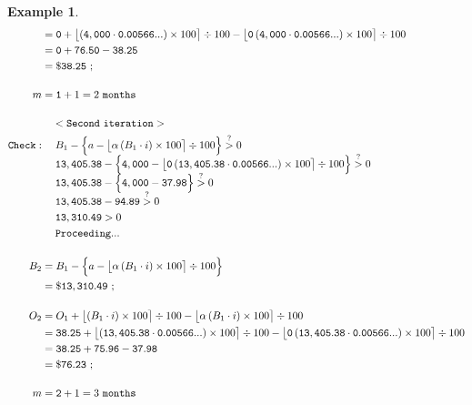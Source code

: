 \documentclass[12pt,letterpaper,oneside]{article}
\newtheorem{example}{Example}[section]
\theoremstyle{remark} %
\begin{document}
\begin{example}
\begin{align*}
	&=\mathtt{\interest}+\big\lfloor{\left(\mathtt{\balance}\cdot \mathtt{\rate}\right)\times 100}\big\rceil\div 100-\big\lfloor{\mathtt{\proportion}\left(\mathtt{\balance}\cdot \mathtt{\rate}\right)\times 100}\big\rceil\div 100\\
	&=\mathtt{\interest}+\mathtt{76.50}-\mathtt{38.25}\\
	&=\mathtt{\$38.25}\ ;\\[12pt]
	m&=\mathtt{\monthsp}+1=2\mathtt{\ months}\\[12pt]
	&\quad\;\mathtt{<Second\ iteration>}\\
	\mathtt{Check:}&\quad\;B_{\monthsitb}-\Big\{a-\big\lfloor{\alpha\left(B_{\monthsitb}\cdot i\right)\times 100}\big\rceil\div 100\Big\}\overset{?}{>}0\\[-6pt]
	&\quad\;\mathtt{\balanceitb}-\Big\{\mathtt{\amount}-\big\lfloor{\mathtt{\proportion}\left(\mathtt{\balanceitb}\cdot \mathtt{\rate}\right)\times 100}\big\rceil\div 100\Big\}\overset{?}{>}0\\[-6pt]
	&\quad\;\mathtt{\balanceitb}-\Big\{\mathtt{\amount}-\mathtt{37.98}\Big\}\overset{?}{>}0\\[-6pt]
	&\quad\;\mathtt{\balanceitb}-\mathtt{94.89}\overset{?}{>}0\\
	&\quad\;\mathtt{13,310.49}>0\\
	&\quad\;\mathtt{Proceeding...}\\[12pt]
	B_{\monthspitb}&=B_{\monthsitb}-\Big\{a-\big\lfloor{\alpha\left(B_{\monthsitb}\cdot i\right)\times 100}\big\rceil\div 100\Big\}\\
	&=\mathtt{\$13,310.49}\ ;\\[12pt]
	O_{\monthspitb}&=O_{\monthsitb}+\big\lfloor{\left(B_{\monthsitb}\cdot i\right)\times 100}\big\rceil\div 100-\big\lfloor{\alpha\left(B_{\monthsitb}\cdot i\right)\times 100}\big\rceil\div 100\\
	&=\mathtt{\interestitb}+\big\lfloor{\left(\mathtt{\balanceitb}\cdot \mathtt{\rate}\right)\times 100}\big\rceil\div 100-\big\lfloor{\mathtt{\proportion}\left(\mathtt{\balanceitb}\cdot \mathtt{\rate}\right)\times 100}\big\rceil\div 100\\
	&=\mathtt{\interestitb}+\mathtt{75.96}-\mathtt{37.98}\\
	&=\mathtt{\$76.23}\ ;\\[12pt]
	m&=\mathtt{\monthspitb}+1=3\mathtt{\ months}\\[48pt] %

\end{align*}
\end{example}
\end{document}
